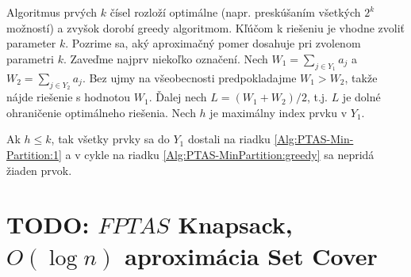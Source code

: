 Algoritmus \algA prvých $k$ čísel rozloží optimálne (napr. preskúšaním všetkých $2^k$
možností) a zvyšok dorobí greedy algoritmom. Kľúčom k riešeniu je vhodne zvoliť
parameter $k$.  Pozrime sa, aký aproximačný pomer \algA dosahuje pri 
zvolenom parametri $k$.  Zaveďme najprv niekoľko označení.  Nech
$W_1=\sum_{j\in Y_1}a_j$ a $W_2=\sum_{j\in Y_2}a_j$. Bez ujmy na všeobecnosti
predpokladajme $W_1>W_2$, takže \algA nájde riešenie s hodnotou $W_1$. 
Ďalej nech $L=(W_1+W_2)/2$, t.j. $L$ je dolné
ohraničenie optimálneho riešenia.
Nech $h$ je maximálny index prvku v $Y_1$.

Ak $h\le k$, tak všetky prvky sa do $Y_1$ dostali na riadku \ref{Alg:PTAS-Min-Partition:1} a v cykle
na riadku
\ref{Alg:PTAS-MinPartition:greedy} sa nepridá žiaden prvok.




\section*{TODO: $FPTAS$ Knapsack, $O(\log n)$ aproximácia Set Cover}

